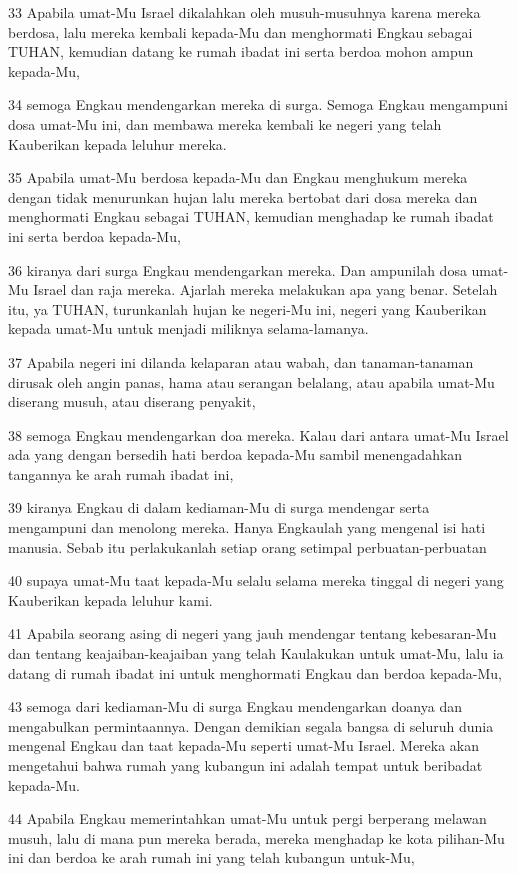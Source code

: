 \par 33 Apabila umat-Mu Israel dikalahkan oleh musuh-musuhnya karena mereka berdosa, lalu mereka kembali kepada-Mu dan menghormati Engkau sebagai TUHAN, kemudian datang ke rumah ibadat ini serta berdoa mohon ampun kepada-Mu,
\par 34 semoga Engkau mendengarkan mereka di surga. Semoga Engkau mengampuni dosa umat-Mu ini, dan membawa mereka kembali ke negeri yang telah Kauberikan kepada leluhur mereka.
\par 35 Apabila umat-Mu berdosa kepada-Mu dan Engkau menghukum mereka dengan tidak menurunkan hujan lalu mereka bertobat dari dosa mereka dan menghormati Engkau sebagai TUHAN, kemudian menghadap ke rumah ibadat ini serta berdoa kepada-Mu,
\par 36 kiranya dari surga Engkau mendengarkan mereka. Dan ampunilah dosa umat-Mu Israel dan raja mereka. Ajarlah mereka melakukan apa yang benar. Setelah itu, ya TUHAN, turunkanlah hujan ke negeri-Mu ini, negeri yang Kauberikan kepada umat-Mu untuk menjadi miliknya selama-lamanya.
\par 37 Apabila negeri ini dilanda kelaparan atau wabah, dan tanaman-tanaman dirusak oleh angin panas, hama atau serangan belalang, atau apabila umat-Mu diserang musuh, atau diserang penyakit,
\par 38 semoga Engkau mendengarkan doa mereka. Kalau dari antara umat-Mu Israel ada yang dengan bersedih hati berdoa kepada-Mu sambil menengadahkan tangannya ke arah rumah ibadat ini,
\par 39 kiranya Engkau di dalam kediaman-Mu di surga mendengar serta mengampuni dan menolong mereka. Hanya Engkaulah yang mengenal isi hati manusia. Sebab itu perlakukanlah setiap orang setimpal perbuatan-perbuatan
\par 40 supaya umat-Mu taat kepada-Mu selalu selama mereka tinggal di negeri yang Kauberikan kepada leluhur kami.
\par 41 Apabila seorang asing di negeri yang jauh mendengar tentang kebesaran-Mu dan tentang keajaiban-keajaiban yang telah Kaulakukan untuk umat-Mu, lalu ia datang di rumah ibadat ini untuk menghormati Engkau dan berdoa kepada-Mu,
\par 43 semoga dari kediaman-Mu di surga Engkau mendengarkan doanya dan mengabulkan permintaannya. Dengan demikian segala bangsa di seluruh dunia mengenal Engkau dan taat kepada-Mu seperti umat-Mu Israel. Mereka akan mengetahui bahwa rumah yang kubangun ini adalah tempat untuk beribadat kepada-Mu.
\par 44 Apabila Engkau memerintahkan umat-Mu untuk pergi berperang melawan musuh, lalu di mana pun mereka berada, mereka menghadap ke kota pilihan-Mu ini dan berdoa ke arah rumah ini yang telah kubangun untuk-Mu,
